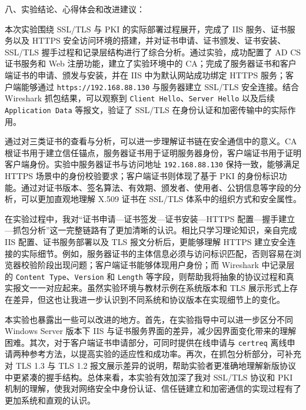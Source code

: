 \documentclass[12pt]{ctexart}
\begin{document}
{\heiti{} 八、实验结论、心得体会和改进建议：}

本次实验围绕 SSL/TLS 与 PKI 的实际部署过程展开，完成了 IIS 服务、证书服务以及 HTTPS 安全访问环境的搭建，并对证书申请、证书颁发、证书安装、SSL/TLS 握手过程和记录层结构进行了综合分析。通过实验，成功配置了 AD CS 证书服务和 Web 注册功能，建立了实验环境中的 CA；完成了服务器证书和客户端证书的申请、颁发与安装，并在 IIS 中为默认网站成功绑定 HTTPS 服务；客户端能够通过 \texttt{https://192.168.88.130} 与服务器建立 SSL/TLS 安全连接。结合 Wireshark 抓包结果，可以观察到 \texttt{Client Hello}、\texttt{Server Hello} 以及后续 \texttt{Application Data} 等报文，验证了 SSL/TLS 在身份认证和加密传输中的实际作用。

通过对三类证书的查看与分析，可以进一步理解证书链在安全通信中的意义。CA 根证书用于建立信任锚点，服务器证书用于证明服务器身份，客户端证书用于证明客户端身份。实验中服务器证书与访问地址 \texttt{192.168.88.130} 保持一致，能够满足 HTTPS 场景中的身份校验要求；客户端证书则体现了基于 PKI 的身份标识功能。通过对证书版本、签名算法、有效期、颁发者、使用者、公钥信息等字段的分析，可以更加直观地理解 X.509 证书在 SSL/TLS 体系中的组织方式和安全属性。

在实验过程中，我对“证书申请—证书签发—证书安装—HTTPS 配置—握手建立—抓包分析”这一完整链路有了更加清晰的认识。相比只学习理论知识，亲自完成 IIS 配置、证书服务部署以及 TLS 报文分析后，更能够理解 HTTPS 建立安全连接的实际细节。例如，服务器证书的主体信息必须与访问标识匹配，否则容易在浏览器校验阶段出现问题；客户端证书能够体现用户身份；而 Wireshark 中记录层的 \texttt{Content Type}、\texttt{Version} 和 \texttt{Length} 等字段，则帮助我将抽象的协议过程和真实报文一一对应起来。虽然实验环境与教材示例在系统版本和 TLS 展示形式上存在差异，但这也让我进一步认识到不同系统和协议版本在实现细节上的变化。

本实验也暴露出一些可以改进的地方。首先，在实验指导中可以进一步区分不同 Windows Server 版本下 IIS 与证书服务界面的差异，减少因界面变化带来的理解困难。其次，对于客户端证书申请部分，可同时提供在线申请与 \texttt{certreq} 离线申请两种参考方法，以提高实验的适应性和成功率。再次，在抓包分析部分，可补充对 TLS 1.3 与 TLS 1.2 报文展示差异的说明，帮助实验者更准确地理解新版协议中更紧凑的握手结构。总体来看，本实验有效加深了我对 SSL/TLS 协议和 PKI 机制的理解，使我对网络安全中身份认证、信任链建立和加密通信的实现过程有了更加系统和直观的认识。
\end{document}
